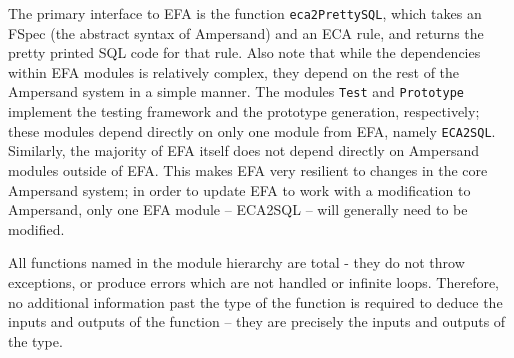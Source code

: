 The primary interface to EFA is the function \lstinline{eca2PrettySQL}, which 
takes an FSpec (the abstract syntax of Ampersand) and an ECA rule, and returns 
the pretty
printed SQL code for that rule. Also note that while the dependencies within EFA
modules is relatively complex, they depend on the rest of the Ampersand system
in a simple manner. The modules \lstinline{Test} and \lstinline{Prototype} 
implement the testing
framework and the prototype generation, respectively; these modules depend
directly on only one module from EFA, namely \lstinline{ECA2SQL}. Similarly, the
majority of EFA itself does not depend directly on Ampersand modules outside of
EFA. This makes EFA very resilient to changes in the core Ampersand system; in
order to update EFA to work with a modification to Ampersand, only one EFA
module -- ECA2SQL -- will generally need to be modified. 

All functions named in the module hierarchy are total - they do not throw
exceptions, or produce errors which are not handled or infinite loops. 
Therefore, no
additional information past the type of the function is required to deduce the
inputs and outputs of the function -- they are precisely the inputs and outputs
of the type.

